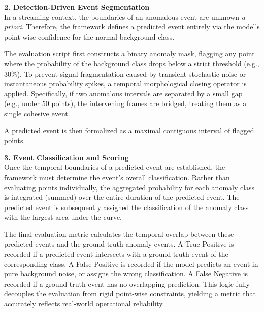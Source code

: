 \textbf{2. Detection-Driven Event Segmentation} \\
In a streaming context, the boundaries of an anomalous event are unknown \textit{a priori}. Therefore, the framework defines a predicted event entirely via the model's point-wise confidence for the normal background class. 

The evaluation script first constructs a binary anomaly mask, flagging any point where the probability of the background class drops below a strict threshold (e.g., $30\%$). To prevent signal fragmentation caused by transient stochastic noise or instantaneous probability spikes, a temporal morphological closing operator is applied. Specifically, if two anomalous intervals are separated by a small gap (e.g., under 50 points), the intervening frames are bridged, treating them as a single cohesive event. 

A predicted event is then formalized as a maximal contiguous interval of flagged points.

\textbf{3. Event Classification and Scoring} \\
Once the temporal boundaries of a predicted event are established, the framework must determine the event's overall classification. Rather than evaluating points individually, the aggregated probability for each anomaly class is integrated (summed) over the entire duration of the predicted event. The predicted event is subsequently assigned the classification of the anomaly class with the largest area under the curve.

The final evaluation metric calculates the temporal overlap between these predicted events and the ground-truth anomaly events. A True Positive is recorded if a predicted event intersects with a ground-truth event of the corresponding class. A False Positive is recorded if the model predicts an event in pure background noise, or assigns the wrong classification. A False Negative is recorded if a ground-truth event has no overlapping prediction. This logic fully decouples the evaluation from rigid point-wise constraints, yielding a metric that accurately reflects real-world operational reliability.
